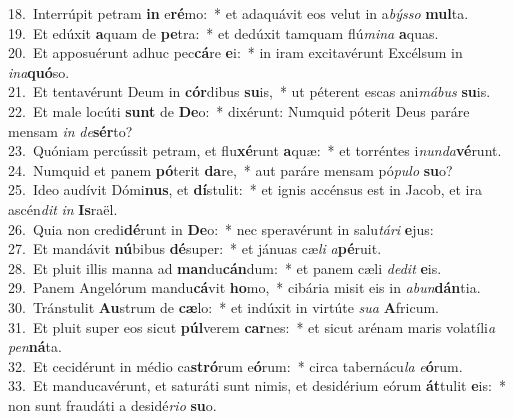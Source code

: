 {18.~}Interrúpit petram \textbf{in} e\textbf{ré}mo:~* et adaquávit eos velut in a\textit{býs}\textit{so} \textbf{mul}ta.\\
{19.~}Et edúxit \textbf{a}quam de \textbf{pe}tra:~* et dedúxit tamquam flú\textit{mi}\textit{na} \textbf{a}quas.\\
{20.~}Et apposuérunt adhuc pec\textbf{cá}re \textbf{e}i:~* in iram excitavérunt Excélsum in \textit{i}\textit{na}\textbf{quó}so.\\
{21.~}Et tentavérunt Deum in \textbf{cór}dibus \textbf{su}is,~* ut péterent escas ani\textit{má}\textit{bus} \textbf{su}is.\\
{22.~}Et male locúti \textbf{sunt} de \textbf{De}o:~* dixérunt: Numquid póterit Deus paráre mensam \textit{in} \textit{de}\textbf{sér}to?\\
{23.~}Quóniam percússit petram, et flu\textbf{xé}runt \textbf{a}quæ:~* et torréntes i\textit{nun}\textit{da}\textbf{vé}runt.\\
{24.~}Numquid et panem \textbf{pó}terit \textbf{da}re,~* aut paráre mensam pó\textit{pu}\textit{lo} \textbf{su}o?\\
{25.~}Ideo audívit Dómi\textbf{nus}, et \textbf{dí}stulit:~* et ignis accénsus est in Jacob, et ira ascén\textit{dit} \textit{in} \textbf{Is}raël.\\
{26.~}Quia non credi\textbf{dé}runt in \textbf{De}o:~* nec speravérunt in salu\textit{tá}\textit{ri} \textbf{e}jus:\\
{27.~}Et mandávit \textbf{nú}bibus \textbf{dé}super:~* et jánuas cæ\textit{li} \textit{a}\textbf{pé}ruit.\\
{28.~}Et pluit illis manna ad \textbf{man}du\textbf{cán}dum:~* et panem cæli \textit{de}\textit{dit} \textbf{e}is.\\
{29.~}Panem Angelórum mandu\textbf{cá}vit \textbf{ho}mo,~* cibária misit eis in \textit{a}\textit{bun}\textbf{dán}tia.\\
{30.~}Tránstulit \textbf{Au}strum de \textbf{cæ}lo:~* et indúxit in virtúte \textit{su}\textit{a} \textbf{A}fricum.\\
{31.~}Et pluit super eos sicut \textbf{púl}verem \textbf{car}nes:~* et sicut arénam maris volatíli\textit{a} \textit{pen}\textbf{ná}ta.\\
{32.~}Et cecidérunt in médio ca\textbf{stró}rum e\textbf{ó}rum:~* circa tabernácu\textit{la} \textit{e}\textbf{ó}rum.\\
{33.~}Et manducavérunt, et saturáti sunt nimis, et desidérium eórum \textbf{át}tulit \textbf{e}is:~* non sunt fraudáti a desidé\textit{ri}\textit{o} \textbf{su}o.\\
